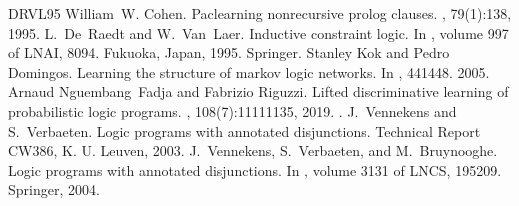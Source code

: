 \documentclass[letterpaper,10pt,english]{sphinxmanual}
\begin{document}
\begin{sphinxthebibliography}{DRVL95}
\sphinxAtStartPar
William W. Cohen. Pac\sphinxhyphen{}learning non\sphinxhyphen{}recursive prolog clauses. , 79(1):1\textendash{}38, 1995.
\sphinxAtStartPar
L. De Raedt and W. Van Laer. Inductive constraint logic. In , volume 997 of LNAI, 80\textendash{}94. Fukuoka, Japan, 1995. Springer.
\sphinxAtStartPar
Stanley Kok and Pedro Domingos. Learning the structure of markov logic networks. In , 441\textendash{}448. 2005.
\sphinxAtStartPar
Arnaud Nguembang Fadja and Fabrizio Riguzzi. Lifted discriminative learning of probabilistic logic programs. , 108(7):1111\textendash{}1135, 2019. .
\sphinxAtStartPar
J. Vennekens and S. Verbaeten. Logic programs with annotated disjunctions. Technical Report CW386, K. U. Leuven, 2003.
\sphinxAtStartPar
J. Vennekens, S. Verbaeten, and M. Bruynooghe. Logic programs with annotated disjunctions. In , volume 3131 of LNCS, 195\textendash{}209. Springer, 2004.
\end{sphinxthebibliography}



\renewcommand{\indexname}{Index}
\printindex
\end{document}
